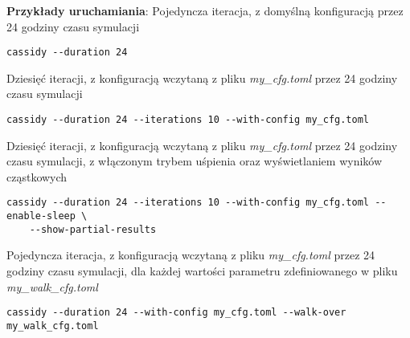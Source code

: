 \noindent \textbf{Przykłady uruchamiania}:
\newline\newline
Pojedyncza iteracja, z domyślną konfiguracją przez 24 godziny czasu symulacji

{
\selectfont 
\begin{verbatim}
cassidy --duration 24
\end{verbatim}
}

\noindent Dziesięć iteracji, z konfiguracją wczytaną z pliku \emph{my\_cfg.toml} przez 24 godziny czasu symulacji

{
\selectfont 
\begin{verbatim}
cassidy --duration 24 --iterations 10 --with-config my_cfg.toml
\end{verbatim}
}

\noindent Dziesięć iteracji, z konfiguracją wczytaną z pliku \emph{my\_cfg.toml} przez 24 godziny czasu symulacji, z włączonym trybem uśpienia oraz wyświetlaniem wyników cząstkowych

{
\selectfont 
\begin{verbatim}
cassidy --duration 24 --iterations 10 --with-config my_cfg.toml --enable-sleep \
	--show-partial-results
\end{verbatim}
}

\noindent Pojedyncza iteracja, z konfiguracją wczytaną z pliku \emph{my\_cfg.toml} przez 24 godziny czasu symulacji, dla każdej wartości parametru zdefiniowanego w pliku \emph{my\_walk\_cfg.toml}

{
\selectfont 
\begin{verbatim}
cassidy --duration 24 --with-config my_cfg.toml --walk-over my_walk_cfg.toml
\end{verbatim}
}

